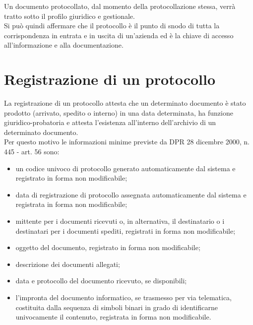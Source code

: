 Un documento protocollato, dal momento della protocollazione stessa, verrà tratto sotto il profilo giuridico e gestionale.
\\
Si può quindi affermare che il protocollo è il punto di snodo di tutta la corrispondenza in entrata e in uscita di un'azienda ed è la chiave di accesso all'informazione e alla documentazione.
\section{Registrazione di un protocollo}
La registrazione di un protocollo attesta che un determinato documento è stato prodotto (arrivato, spedito o interno) in una data determinata, ha funzione giuridico-probatoria e attesta l’esistenza all'interno dell'archivio di un determinato documento.
\\
Per questo motivo le informazioni minime previste da DPR 28 dicembre 2000, n. 445 - art. 56 sono:
\begin{itemize}
    \item un codice univoco di protocollo generato automaticamente dal sistema e registrato in forma non modificabile;
    
    \item data di registrazione di protocollo assegnata automaticamente dal sistema e registrata in forma non modificabile;
    
    \item mittente per i documenti ricevuti o, in alternativa, il destinatario o i destinatari per i documenti spediti, registrati in forma non modificabile;
    
    \item oggetto del documento, registrato in forma non modificabile;
    
    \item descrizione dei documenti allegati;
    
    \item data e protocollo del documento ricevuto, se disponibili;
    
    \item l’impronta del documento informatico, se trasmesso per via telematica, costituita dalla sequenza di simboli binari in grado di identificarne univocamente il contenuto, registrata in forma non modificabile.
\end{itemize}

